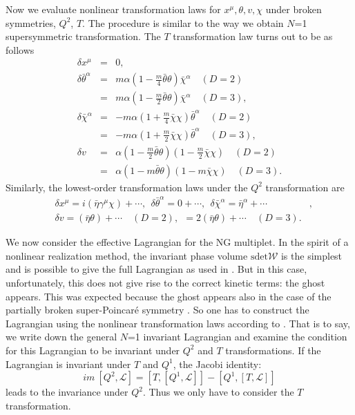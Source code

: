 \documentclass[a4paper,12pt]{article}
\def\btheta{\bar{\theta}}
\def\bchi{\bar{\chi}}
\def\baeta{\bar{\eta}}
\def\CW{\mathcal{W}}
\begin{document}
Now we evaluate nonlinear transformation laws for
$x^{\mu},\theta, v, \chi$ under broken symmetries, $Q^{2}$, $T$.
The procedure is similar to the way we obtain $N$=1 supersymmetric
transformation. The $T$ transformation law turns out to be as follows
\begin{eqnarray}
 \delta x^{\mu} &=& 0, \nonumber \\
 \delta\btheta^{\alpha} &=& m\alpha(1-\frac{m}{4}\btheta\theta)
	\bchi^{\alpha}\quad (D=2)\nonumber \\
	&=& m\alpha(1-\frac{m}{2}\btheta\theta)
	\bchi^{\alpha}\quad (D=3),\nonumber \\
 \delta\bchi^{\alpha} &=& -m\alpha(1+\frac{m}{4}\bchi\chi)
	\btheta^{\alpha}\quad (D=2)\nonumber \\
	&=& -m\alpha(1+\frac{m}{2}\bchi\chi)
	\btheta^{\alpha}\quad (D=3),\label{ttrans}\\
 \delta v &=& \alpha\left( 1 - \frac{m}{2}\btheta\theta\right)
	\left(1- \frac{m}{2}\bchi\chi\right) \quad (D=2) \nonumber \\
	  &=& \alpha\left(1 - m\btheta\theta\right)
	\left(1- m\bchi\chi\right) \quad (D=3). \nonumber
\end{eqnarray}
Similarly, the lowest-order transformation laws under the $Q^{2}$
 transformation are
\begin{eqnarray}
 &\delta x^{\mu} = i(\baeta\gamma^{\mu}\chi) + \cdots,\ \ 
 \delta\btheta^{\alpha} = 0 + \cdots, \ \ 
 \delta\bchi^{\alpha} = \baeta^{\alpha} + \cdots&, \nonumber \\ 
 &\delta v = (\baeta\theta) + \cdots \quad (D=2),\ \ 
	= 2(\baeta\theta) + \cdots \quad (D=3).&
\end{eqnarray}

We now consider the effective Lagrangian for the NG multiplet.
In the spirit of a nonlinear realization method, the invariant
phase volume $\mathrm{sdet}\CW$ is the simplest and
is possible to give the full Lagrangian as used in \cite{Z}. 
But in this case, unfortunately, this does not give rise to the correct
kinetic terms: the ghost appears. This was expected because the
ghost appears also in the case of the partially broken 
super-Poincar{\' e} symmetry \cite{SW}.
So one has to construct
the Lagrangian using the nonlinear transformation laws according 
to \cite{BG1}. That is to say, we write down the general $N$=1
invariant Lagrangian and examine the condition for 
this Lagrangian to be invariant under $Q^{2}$ and $T$
transformations. 
If the Lagrangian is invariant under $T$ and $Q^{1}$,
the Jacobi identity:
\begin{equation}
im\ [Q^{2}, \mathcal{L}] =[T,[Q^{1},\mathcal{L}]]
-[Q^{1},[T,\mathcal{L}]]
\end{equation}
leads to the invariance under $Q^{2}$. Thus we only
have to consider the $T$ transformation.
\end{document}
